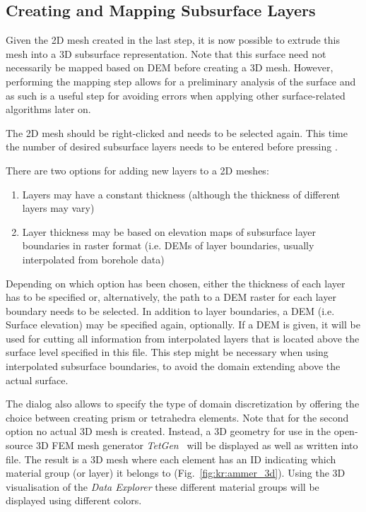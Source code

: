 \subsection{Creating and Mapping Subsurface Layers}

Given the 2D mesh created in the last step, it is now possible to extrude this mesh into a 3D subsurface representation. Note that this surface need not necessarily be mapped based on DEM before creating a 3D mesh. However, performing the mapping step allows for a preliminary analysis of the surface and as such is a useful step for avoiding errors when applying other surface-related algorithms later on.

The 2D mesh should be right-clicked and  needs to be selected again. This time the number of desired subsurface layers needs to be entered before pressing .

There are two options for adding new layers to a 2D meshes:
\begin{enumerate}
\item Layers may have a constant thickness (although the thickness of different layers may vary)
\item Layer thickness may be based on elevation maps of subsurface layer boundaries in raster format (i.e. DEMs of layer boundaries, usually interpolated from borehole data)
\end{enumerate}

Depending on which option has been chosen, either the thickness of each layer has to be specified or, alternatively, the path to a DEM raster for each layer boundary needs to be selected.
In addition to layer boundaries, a DEM (i.e. Surface elevation) may be specified again, optionally. If a DEM is given, it will be used for cutting all information from interpolated layers that is located above the surface level specified in this file. This step might be necessary when using interpolated subsurface boundaries, to avoid the domain extending above the actual surface.

The dialog also allows to specify the type of domain discretization by offering the choice between creating prism or tetrahedra elements. Note that for the second option no actual 3D mesh is created. Instead, a 3D geometry for use in the open-source 3D FEM mesh generator \emph{TetGen}~\cite{tetgen:software} will be displayed as well as written into file. The result is a 3D mesh where each element has an ID indicating which material group (or layer) it belongs to (Fig.~\ref{fig:kr:ammer_3d}). Using the 3D visualisation of the \emph{Data Explorer} these different material groups will be displayed using different colors.


